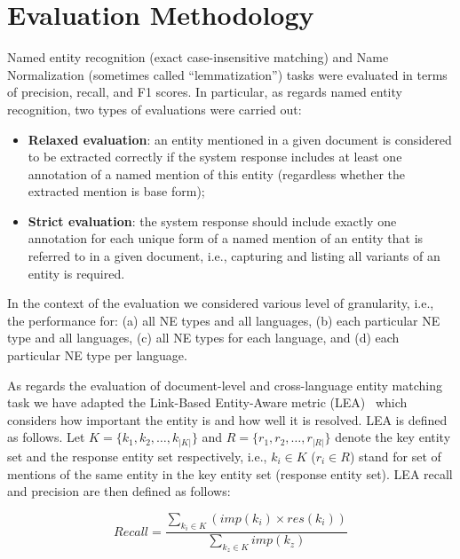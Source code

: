 \documentclass[11pt]{article}
\begin{document}
\section{Evaluation Methodology}
\label{sec:evaluation}

Named entity recognition (exact case-insensitive matching) and  Name Normalization (sometimes called “lemmatization”) tasks were evaluated in terms of precision, recall, and F1 scores. In particular, as regards named entity recognition, two types of evaluations were carried out:

\begin{itemize}

\item \textbf{Relaxed evaluation}: an entity mentioned in a given document is considered to be extracted correctly if the system response includes at least one annotation of a named mention of this entity (regardless whether the extracted mention is base form);

\item \textbf{Strict evaluation}: the system response should include exactly one annotation for each unique form of a named mention of an entity that is referred to in a given document, i.e., capturing and listing all variants of an entity is required.

\end{itemize}

In the context of the evaluation we considered various level of granularity, i.e., the performance for: 
(a) all NE types and all languages, (b) each particular NE type and all languages, (c) all NE types for 
each language, and (d) each particular NE type per language. 

As regards the evaluation of document-level and cross-language entity matching task we have adapted the 
Link-Based Entity-Aware metric (LEA)~\cite{DBLP:conf-acl-Moosavi016} which considers how important the entity is and how well it is resolved. LEA is defined as follows. Let $K = \{k_1,k_2,\ldots,k_{|K|} \}$ and $R = \{r_1,r_2,\ldots,r_{|R|} \}$ denote the key entity set and the response entity set respectively, i.e., $k_i \in K$ ($r_i \in R$) stand for set of mentions
of the same entity in the key entity set (response entity set). LEA recall and precision are then defined as follows:

\begin{equation*}
	\mathit{Recall} = \frac{\sum_{k_{i} \in K} (\mathit{imp}(k_i) \times \mathit{res}(k_{i}))}
              {\sum_{k_{z} \in K} imp(k_{z})}
\end{equation*}
\end{document}
